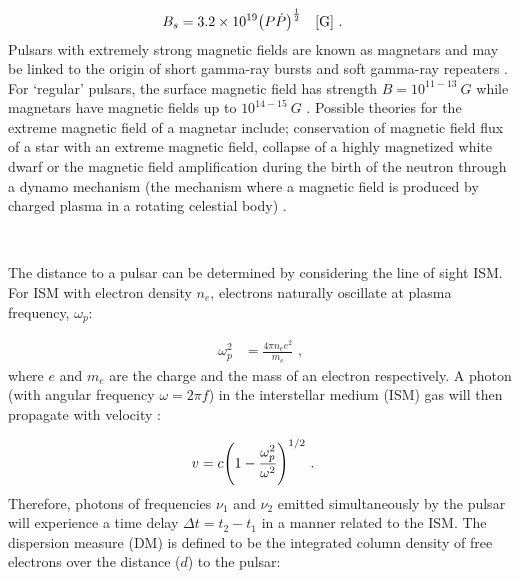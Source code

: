 \begin{equation}
    \begin{aligned}
    B_s&=3.2\times 10^{19}\qty(P\dot{P})^\half\quad\qty[\si{G}]\text{ .}
    \end{aligned}
\end{equation}
\noindent Pulsars with extremely strong magnetic fields are known as magnetars and may be linked to the origin of short gamma-ray bursts and soft gamma-ray repeaters \citep{1992ApJ...392L...9D}. For `regular' pulsars, the surface magnetic field has strength $B=10^{11-13}~\si{G}$ while magnetars have magnetic fields up to $10^{14-15}~\si{G}$ \citep{2007ASSL..326.....H}. Possible theories for the extreme magnetic field of a magnetar include; conservation of magnetic field flux of a star with an extreme magnetic field, collapse of a highly magnetized white dwarf or the magnetic field amplification during the birth of the neutron through a dynamo mechanism (the mechanism where a magnetic field is produced by charged plasma in a rotating celestial body) \citep{1992ApJ...392L...9D, 1993_magnetar, 1996AIPC..366..111D}.
\par~\par
The distance to a pulsar can be determined by considering the line of sight ISM. For ISM with electron density $n_e$, electrons naturally oscillate at plasma frequency, $\omega_p$:

\begin{equation}
    \begin{aligned}
        \omega_p^2&=\frac{4\pi n_ee^2}{m_e}\text{ ,}
    \end{aligned}
\end{equation}
\noindent where $e$ and $m_e$ are the charge and the mass of an electron respectively. A photon (with angular frequency $\omega=2\pi f$) in the interstellar medium (ISM) gas will then propagate with velocity \citep{2011piim.book.....D}:

\begin{equation}
    \begin{aligned}
        v&=c\qty(1-\frac{\omega_p^2}{\omega^2})^{1/2}\text{ .}
    \end{aligned}
\end{equation}
\noindent Therefore, photons of frequencies $\nu_1$ and $\nu_2$ emitted simultaneously by the pulsar will experience a time delay $\Delta t= t_2-t_1$ in a manner related to the ISM. The dispersion measure (DM) is defined to be the integrated column density of free electrons over the distance ($d$) to the pulsar\citep{2011piim.book.....D}:

